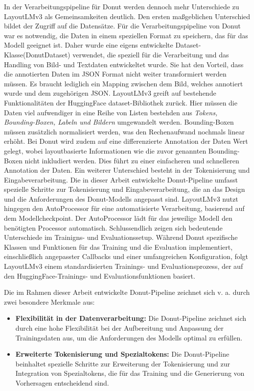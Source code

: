 In der Verarbeitungspipeline für Donut werden dennoch mehr Unterschiede zu LayoutLMv3 als Gemeinsamkeiten deutlich. Den ersten maßgeblichen Unterschied bildet der Zugriff auf die Datensätze. Für die Verarbeitungspipeline von Donut war es notwendig, die Daten in einem speziellen Format zu speichern, das für das Modell geeignet ist. Daher wurde eine eigens entwickelte Dataset-Klasse(DonutDataset) verwendet, die speziell für die Verarbeitung und das Handling von Bild- und Textdaten entwickeltet wurde. Sie hat den Vorteil, dass die annotierten Daten im JSON Format nicht weiter transformiert werden müssen. Es braucht lediglich ein Mapping zwischen dem Bild, welches annotiert wurde und dem zugehörigen JSON. LayoutLMv3 greift auf bestehende Funktionalitäten der HuggingFace dataset-Bibliothek zurück. Hier müssen die Daten viel aufwendiger in eine Reihe von Listen bestehden aus \emph{Tokens, Bounding-Boxen, Labeln und Bildern} umgewandelt werden. Bounding-Boxen müssen zusätzlich normalisiert werden, was den Rechenaufwand nochmals linear erhöht. Bei Donut wird zudem auf eine differenzierte Annotation der Daten Wert gelegt, wobei layoutbasierte Informationen wie die zuvor genannten Bounding-Boxen nicht inkludiert werden. Dies führt zu einer einfacheren und schnelleren Annotation der Daten. Ein weiterer Unterschied besteht in der Tokenisierung und Eingabeverarbeitung. Die in dieser Arbeit entwickelte Donut-Pipeline umfasst spezielle Schritte zur Tokenisierung und Eingabeverarbeitung, die an das Design und die Anforderungen des Donut-Modells angepasst sind. LayoutLMv3 nutzt hingegen den AutoProcessor für eine automatisierte Verarbeitung, basierend auf dem Modellcheckpoint. Der AutoProcessor lädt für das jeweilige Modell den benötigten Processor automatisch. Schlussendlich zeigen sich bedeutende Unterschiede im Trainigns- und Evaluationssetup. Während Donut spezifische Klassen und Funktionen für das Training und die Evaluation implementiert, einschließlich angepasster Callbacks und einer umfangreichen Konfiguration, folgt LayoutLMv3 einem standardisierten Trainings- und Evaluationsprozess, der auf den HuggingFace-Trainings- und Evaluationsfunktionen basiert.

Die im Rahmen dieser Arbeit entwickelte Donut-Pipeline zeichnet sich v. a. durch zwei besondere Merkmale aus:
\begin{itemize}
    \item \textbf{Flexibilität in der Datenverarbeitung:} Die Donut-Pipeline zeichnet sich durch eine hohe Flexibilität bei der Aufbereitung und Anpassung der Trainingsdaten aus, um die Anforderungen des Modells optimal zu erfüllen.
    \item \textbf{Erweiterte Tokenisierung und Spezialtokens:} Die Donut-Pipeline beinhaltet spezielle Schritte zur Erweiterung der Tokenisierung und zur Integration von Spezialtokens, die für das Training und die Generierung von Vorhersagen entscheidend sind.
\end{itemize}

